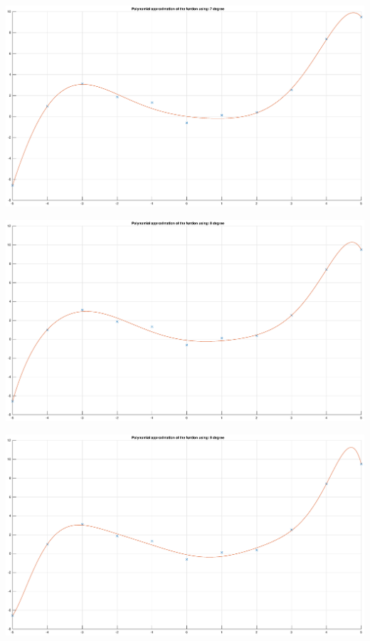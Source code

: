 \documentclass[12pt]{report}
\begin{document}
\begin{center}
   \includegraphics[scale=0.25]{17.eps}
\end{center}

\begin{center}
   \includegraphics[scale=0.25]{18.eps}
\end{center}

\begin{center}
   \includegraphics[scale=0.25]{19.eps}
\end{center}
\end{document}
